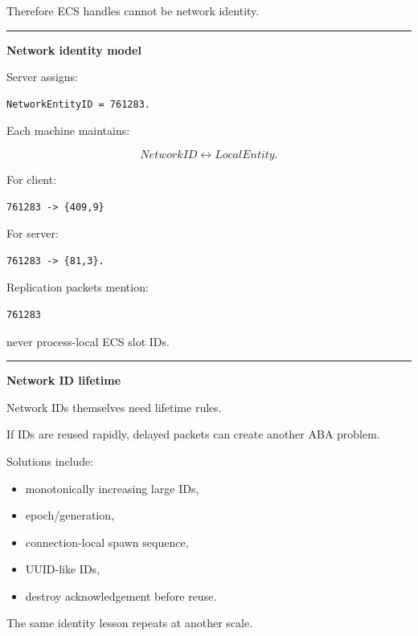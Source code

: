Therefore ECS handles cannot be network identity.

\begin{center}\rule{0.5\linewidth}{0.5pt}\end{center}

\textbf{Network identity model}

Server assigns:

\begin{verbatim}
NetworkEntityID = 761283.
\end{verbatim}

Each machine maintains:

\[
NetworkID
\leftrightarrow
LocalEntity.
\]

For client:

\begin{verbatim}
761283 -> {409,9}
\end{verbatim}

For server:

\begin{verbatim}
761283 -> {81,3}.
\end{verbatim}

Replication packets mention:

\begin{verbatim}
761283
\end{verbatim}

never process-local ECS slot IDs.

\begin{center}\rule{0.5\linewidth}{0.5pt}\end{center}

\textbf{Network ID lifetime}

Network IDs themselves need lifetime rules.

If IDs are reused rapidly, delayed packets can create another ABA problem.

Solutions include:

\begin{itemize}
\tightlist
\item
  monotonically increasing large IDs,
\item
  epoch/generation,
\item
  connection-local spawn sequence,
\item
  UUID-like IDs,
\item
  destroy acknowledgement before reuse.
\end{itemize}

The same identity lesson repeats at another scale.


